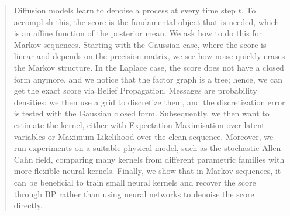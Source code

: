 \documentclass{article}
\begin{document}

\printAffiliationsAndNotice{}

\begin{abstract}

Diffusion models learn to denoise a process at every time step $t$. To accomplish this, the score is the fundamental object that is needed, which is an affine function of the posterior mean. We ask how to do this for Markov sequences. Starting with the Gaussian case, where the score is linear and depends on the precision matrix, we see how noise quickly erases the Markov structure. In the Laplace case, the score does not have a closed form anymore, and we notice that the factor graph is a tree; hence, we can get the exact score via Belief Propagation. Messages are probability densities; we then use a grid to discretize them, and the discretization error is tested with the Gaussian closed form. Subsequently, we then want to estimate the kernel, either with Expectation Maximisation over latent variables or Maximum Likelihood over the clean sequence. Moreover, we run experiments on a suitable physical model, such as the stochastic Allen-Cahn field, comparing many kernels from different parametric families with more flexible neural kernels. Finally, we show that in Markov sequences, it can be beneficial to train small neural kernels and recover the score through BP rather than using neural networks to denoise the score directly.
\end{abstract}
\end{document}
